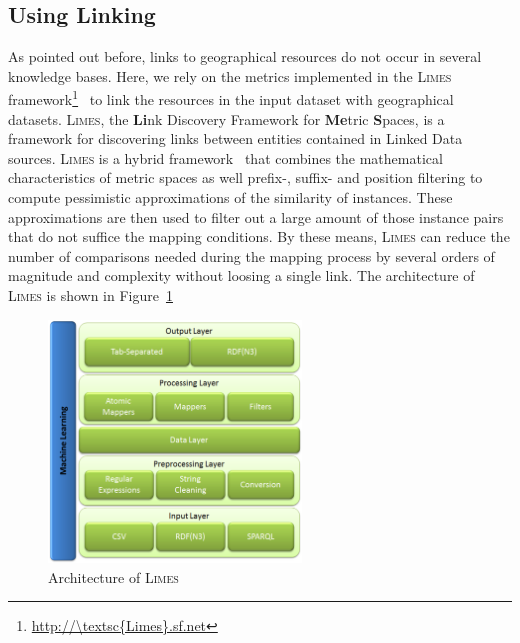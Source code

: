 \documentclass[a4paper,twoside,bibtotoc,abstracton,12pt,BCOR=15mm]{article}
\newcommand{\limes}{\textsc{Limes}\xspace}
\begin{document}
\subsection{Using Linking}
As pointed out before, links to geographical resources do not occur in several knowledge bases.
Here, we rely on the metrics implemented in the \limes framework\footnote{\url{http://\limes.sf.net}}~\cite{NGAU11,NGON12c,NGO+13c} to link the resources in the input dataset with geographical datasets.
\limes, the \textbf{Li}nk Discovery Framework for \textbf{Me}tric \textbf{S}paces, is a framework for discovering links between entities contained in Linked Data sources. \limes is a hybrid framework~\cite{NGON12c} that combines the mathematical characteristics of metric spaces as well prefix-, suffix- and position filtering to compute pessimistic approximations of the similarity of instances. These approximations are then used to filter out a large amount of those instance pairs that do not suffice the mapping conditions. By these means, \limes can reduce the number of comparisons needed during the mapping process by several orders of magnitude and complexity without loosing a single link.
The architecture of \limes is shown in Figure~\ref{fig:limesArchitecture}

\begin{figure}[ht!]
			\centering
			\includegraphics[width = 0.6\textwidth]{images/limesArchitecture.png}
			\caption{Architecture of \limes}
			\label{fig:limesArchitecture}
		\end{figure}
		
\end{document}
